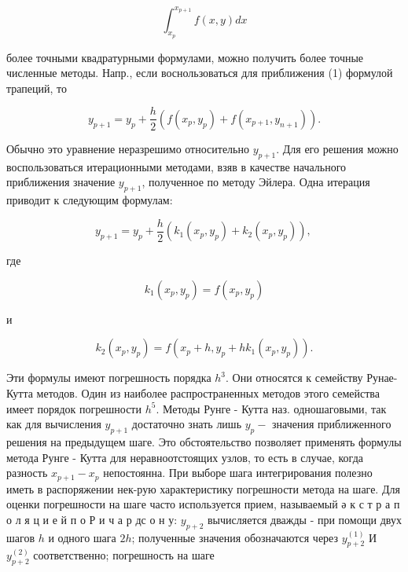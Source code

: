 \documentclass[10pt]{article}
\begin{document}
\[

\int_{x_{p}}^{x_{p+1}} f(x, y) d x

\]



более точными квадратурными формулами, можно получить более точные численные методы. Напр., если воснользоваться для приближения (1) формулой трапеций, то



\[

y_{p+1}=y_{p}+\frac{h}{2}\left(f\left(x_{p}, y_{p}\right)+f\left(x_{p+1}, y_{n+1}\right)\right) .

\]



Обычно это уравнение неразрешимо относительно $y_{p+1}$. Для его решения можно воспользоваться итерационными методами, взяв в качестве начального приближения значение $y_{p+1}$, полученное по методу Эйлера. Одна итерация приводит к следующим формулам:



\[

y_{p+1}=y_{p}+\frac{h}{2}\left(k_{1}\left(x_{p}, y_{p}\right)+k_{2}\left(x_{p}, y_{p}\right)\right) \text {, }

\]



где



\[

k_{1}\left(x_{p}, y_{p}\right)=f\left(x_{p}, y_{p}\right)

\]



и



\[

k_{2}\left(x_{p}, y_{p}\right)=f\left(x_{p}+h, y_{p}+h k_{1}\left(x_{p}, y_{p}\right)\right) .

\]



Эти формулы имеют погрешность порядка $h^{3}$. Они относятся к семейству Рунае-Кутта методов. Один из наиболее распространенных методов этого семейства имеет порядок погрешности $h^{5}$. Методы Рунге - Кутта наз. одношаговыми, так как для вычисления $y_{p+1}$ достаточно знать лишь $y_{p}-$ значения приближенного решения на предыдущем шаге. Это обстоятельство позволяет применять формулы метода Рунге - Кутта для неравноотстоящих узлов, то есть в случае, когда разность $x_{p+1}-x_{p}$ непостоянна. При выборе шага интегрирования полезно иметь в распоряжении нек-рую характеристику погрешности метода на шаге. Для оценки погрешности на шаге часто используется прием, называемый ә к с т р а п о л я ц и е й п о Р и ч а р дс о н у: $y_{p+2}$ вычисляется дважды - при помощи двух шагов $h$ и одного шага $2 h$; полученные значения обозначаются через $y_{p+2}^{(1)}$ И $y_{p+2}^{(2)}$ соответственно; погрешность на шаге
\end{document}
